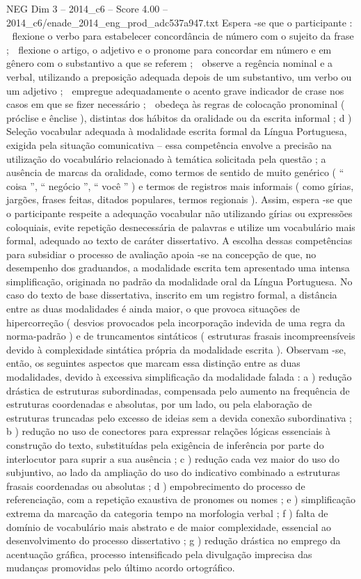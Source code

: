 \begin{textsample}{NEG Dim 3 – 2014\_c6 – Score 4.00 – 2014\_c6/enade\_2014\_eng\_prod\_adc537a947.txt}
Espera -se que o participante :  flexione o verbo para estabelecer concordância de número com o sujeito da frase ;  flexione o artigo, o adjetivo e o pronome para concordar em número e em gênero com o substantivo a que se referem ;  observe a regência nominal e a verbal, utilizando a preposição adequada depois de um substantivo, um verbo ou um adjetivo ;  empregue adequadamente o acento grave indicador de crase nos casos em que se fizer necessário ;  obedeça às regras de colocação pronominal ( próclise e ênclise ), distintas dos hábitos da oralidade ou da escrita informal ; d ) Seleção vocabular adequada à modalidade escrita formal da Língua Portuguesa, exigida pela situação comunicativa – essa competência envolve a precisão na utilização do vocabulário relacionado à temática solicitada pela questão ; a ausência de marcas da oralidade, como termos de sentido de muito genérico ( “ coisa ”, “ negócio ”, “ você ” ) e termos de registros mais informais ( como gírias, jargões, frases feitas, ditados populares, termos regionais ).
Assim, espera -se que o participante respeite a adequação vocabular não utilizando gírias ou expressões coloquiais, evite repetição desnecessária de palavras e utilize um vocabulário mais formal, adequado ao texto de caráter dissertativo.
A escolha dessas competências para subsidiar o processo de avaliação apoia -se na concepção de que, no desempenho dos graduandos, a modalidade escrita tem apresentado uma intensa simplificação, originada no padrão da modalidade oral da Língua Portuguesa.
No caso do texto de base dissertativa, inscrito em um registro formal, a distância entre as duas modalidades é ainda maior, o que provoca situações de hipercorreção ( desvios provocados pela incorporação indevida de uma regra da norma-padrão ) e de truncamentos sintáticos ( estruturas frasais incompreensíveis devido à complexidade sintática própria da modalidade escrita ).
Observam -se, então, os seguintes aspectos que marcam essa distinção entre as duas modalidades, devido à excessiva simplificação da modalidade falada : a ) redução drástica de estruturas subordinadas, compensada pelo aumento na frequência de estruturas coordenadas e absolutas, por um lado, ou pela elaboração de estruturas truncadas pelo excesso de ideias sem a devida conexão subordinativa ; b ) redução no uso de conectores para expressar relações lógicas essenciais à construção do texto, substituídas pela exigência de inferência por parte do interlocutor para suprir a sua ausência ; c ) redução cada vez maior do uso do subjuntivo, ao lado da ampliação do uso do indicativo combinado a estruturas frasais coordenadas ou absolutas ; d ) empobrecimento do processo de referenciação, com a repetição exaustiva de pronomes ou nomes ; e ) simplificação extrema da marcação da categoria tempo na morfologia verbal ; f ) falta de domínio de vocabulário mais abstrato e de maior complexidade, essencial ao desenvolvimento do processo dissertativo ; g ) redução drástica no emprego da acentuação gráfica, processo intensificado pela divulgação imprecisa das mudanças promovidas pelo último acordo ortográfico.

\end{textsample}
